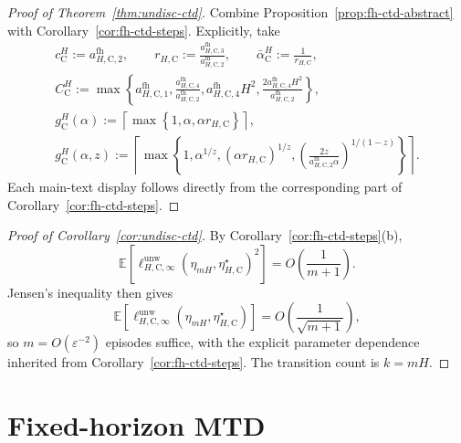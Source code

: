 \documentclass{article}
\begin{document}
\begin{proof}[Proof of Theorem~\ref{thm:undisc-ctd}]
Combine Proposition~\ref{prop:fh-ctd-abstract} with Corollary~\ref{cor:fh-ctd-steps}. Explicitly, take
\begin{equation}
\begin{gathered}
c_{\mathrm C}^H:=a_{H,\mathrm C,2}^{\mathrm{fh}},\qquad r_{H,\mathrm C}:=\frac{a_{H,\mathrm C,3}^{\mathrm{fh}}}{a_{H,\mathrm C,2}^{\mathrm{fh}}},\qquad \bar\alpha_{\mathrm C}^H:=\frac{1}{r_{H,\mathrm C}}, \\
C_{\mathrm C}^H:=\max\left\{a_{H,\mathrm C,1}^{\mathrm{fh}},\frac{a_{H,\mathrm C,4}^{\mathrm{fh}}}{a_{H,\mathrm C,2}^{\mathrm{fh}}},a_{H,\mathrm C,4}^{\mathrm{fh}}H^2,\frac{2a_{H,\mathrm C,4}^{\mathrm{fh}}H^2}{a_{H,\mathrm C,2}^{\mathrm{fh}}}\right\}, \\
g_{\mathrm C}^H(\alpha):=\left\lceil\max\left\{1,\alpha,\alpha r_{H,\mathrm C}\right\}\right\rceil, \\
g_{\mathrm C}^H(\alpha,z):=\left\lceil\max\left\{1,\alpha^{1/z},(\alpha r_{H,\mathrm C})^{1/z},\left(\frac{2z}{a_{H,\mathrm C,2}^{\mathrm{fh}}\alpha}\right)^{1/(1-z)}\right\}\right\rceil.
\end{gathered}
\end{equation}
Each main-text display follows directly from the corresponding part of Corollary~\ref{cor:fh-ctd-steps}.
\end{proof}

\begin{proof}[Proof of Corollary~\ref{cor:undisc-ctd}]
By Corollary~\ref{cor:fh-ctd-steps}\textup{(b)},
\begin{equation}
\mathbb E\left[ \ell_{H,\mathrm C,\infty}^{\mathrm{unw}}(\eta_{mH},\eta_{H,\mathrm C}^\star)^2 \right] = O\left(\frac{1}{m+1}\right).
\end{equation}
Jensen's inequality then gives
\begin{equation}
\mathbb E\left[ \ell_{H,\mathrm C,\infty}^{\mathrm{unw}}(\eta_{mH},\eta_{H,\mathrm C}^\star) \right] = O\left(\frac{1}{\sqrt{m+1}}\right),
\end{equation}
so $m = O(\varepsilon^{-2})$ episodes suffice, with the explicit parameter dependence inherited from Corollary~\ref{cor:fh-ctd-steps}. The transition count is $k=mH$.
\end{proof}

\section{Fixed-horizon MTD}
\label{app:fh-mtd}
\end{document}
